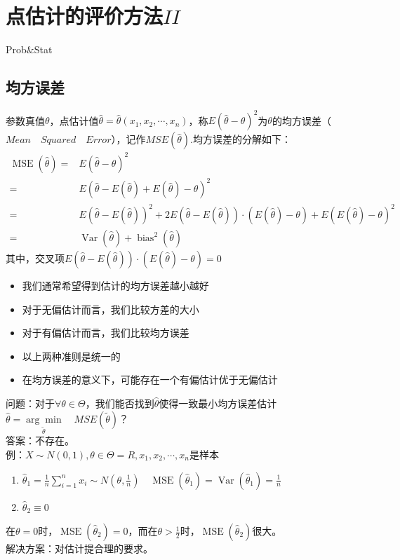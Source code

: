 
\chapter{点估计的评价方法$II$}
\begin{introduction}
  \item Prob$\&$Stat
\end{introduction}
\section{均方误差}
参数真值$\theta$，点估计值$\hat{\theta}=\hat{\theta}(x_{1},x_{2},\cdots,x_{n})$，称$E(\hat{\theta}-\theta)^{2}$为$\theta$的均方误差（$Mean \quad Squared \quad Error$），记作$MSE(\hat{\theta})$.均方误差的分解如下：
$$\begin{aligned}
\operatorname{MSE}(\hat{\theta})=& E(\hat{\theta}-\theta)^{2} \\
=& E(\hat{\theta}-E(\hat{\theta})+E(\hat{\theta})-\theta)^{2} \\
=& E(\hat{\theta}-E(\hat{\theta}))^{2}+2 E(\hat{\theta}-E(\hat{\theta})) \cdot(E(\hat{\theta})-\theta) +E(E(\hat{\theta})-\theta)^{2} \\
=& \operatorname{Var}(\hat{\theta})+\operatorname{bias}^{2}(\hat{\theta})
\end{aligned}
$$其中，交叉项$E(\hat{\theta}-E(\hat{\theta})) \cdot(E(\hat{\theta})-\theta) =0$\\
\begin{remark}
\begin{itemize}
    \item 我们通常希望得到估计的均方误差越小越好
    \item 对于无偏估计而言，我们比较方差的大小
    \item 对于有偏估计而言，我们比较均方误差
    \item 以上两种准则是统一的
    \item 在均方误差的意义下，可能存在一个有偏估计优于无偏估计\\
\end{itemize}
\end{remark}
问题：对于$\forall \theta \in \Theta $，我们能否找到$\hat{\theta}$使得一致最小均方误差估计$\hat{\theta}=\underset{\tilde{\theta}  }{\arg \min } \quad MSE(\tilde{\theta} )$？\\
答案：不存在。\\
例：$X\sim N(0,1),\theta\in\Theta=R,x_{1},x_{2},\cdots,x_{n}$是样本
\begin{enumerate}
    \item $\hat{\theta}_{1}=\frac{1}{n} \sum_{i=1}^{n} x_{i} \sim N\left(\theta, \frac{1}{n}\right)\quad \operatorname{MSE}\left(\hat{\theta}_{1}\right)=\operatorname{Var}\left(\hat{\theta}_{1}\right)=\frac{1}{n}$
    
    \item $\hat{\theta}_{2}\equiv 0 $
\end{enumerate}
在$\theta=0$时，$\operatorname{MSE}\left(\hat{\theta}_{2}\right)=0$，而在$\theta>\frac{1}{2}$时，$\operatorname{MSE}\left(\hat{\theta}_{2}\right)$很大。\\
解决方案：对估计提合理的要求。

